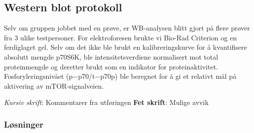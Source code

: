 \documentclass[
  letterpaper,
  DIV=11,
  numbers=noendperiod]{scrreprt}
\begin{document}
\subsection{Western blot protokoll}\label{western-blot-protokoll}

Selv om gruppen jobbet med en prøve, er WB-analysen blitt gjort på flere
prøver fra 3 ulike testpersoner. For elektroforesen brukte vi Bio-Rad
Criterion og en ferdiglaget gel. Selv om det ikke ble brukt en
kalibreringskurve for å kvantifisere absolutt mengde p70S6K, ble
intensitetsverdiene normalisert mot total proteinmengde og deretter
brukt som en indikator for proteinaktivitet. Fosforyleringsnivået
(p−p70/t−p70p) ble beregnet for å gi et relativt mål på aktivering av
mTOR-signalveien.

\emph{Kursiv skrift}: Kommentarer fra utføringen \textbf{Fet skrift}:
Mulige avvik

\subsubsection{Løsninger}\label{luxf8sninger}
\end{document}

